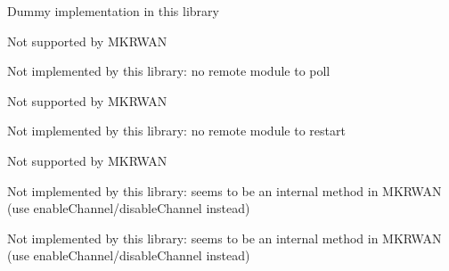 \begin{DoxyRefList}
%
 Dummy implementation in this library  
\item[Member \mbox{\hyperlink{classSTM32LoRaWAN_a14df7748a2df407809fa2862da7194be}{STM32\+Lo\+Ra\+WAN\+::modify\+Channel\+Enabled}} (unsigned pos, bool value)]\label{extensions__extensions000014}%
%
 Not supported by MKRWAN  
\item[Member \mbox{\hyperlink{classSTM32LoRaWAN_a79634164ef1e9c2d8c4d4589cbeaf665}{STM32\+Lo\+Ra\+WAN\+::poll}} ()]\label{extensions__extensions000035}%
%
 Not implemented by this library\+: no remote module to poll  
\item[Member \mbox{\hyperlink{classSTM32LoRaWAN_ac720f4ea2f3efe054908a8f8bdcfc7a5}{STM32\+Lo\+Ra\+WAN\+::powerdB}} (int8\+\_\+t db)]\label{extensions__extensions000012}%
%
 Not supported by MKRWAN  
\item[Member \mbox{\hyperlink{classSTM32LoRaWAN_a8a715c4ec0ba3a9601a229a8c43d05be}{STM32\+Lo\+Ra\+WAN\+::restart}} ()]\label{extensions__extensions000034}%
%
 Not implemented by this library\+: no remote module to restart  
\item[Member \mbox{\hyperlink{classSTM32LoRaWAN_acd434a7ebbe91a548c010355f7553460}{STM32\+Lo\+Ra\+WAN\+::send}} (const uint8\+\_\+t $\ast$payload, size\+\_\+t size, bool confirmed)]\label{extensions__extensions000019}%
%
 Not supported by MKRWAN  
\item[Member \mbox{\hyperlink{classSTM32LoRaWAN_af21b1d27c22c2e94da4ca2d368620c13}{STM32\+Lo\+Ra\+WAN\+::send\+Mask}} (String new\+Mask)]\label{extensions__extensions000045}%
%
 Not implemented by this library\+: seems to be an internal method in MKRWAN (use enable\+Channel/disable\+Channel instead)  
\item[Member \mbox{\hyperlink{classSTM32LoRaWAN_a79915834d3c8812cfd80a08d62382686}{STM32\+Lo\+Ra\+WAN\+::send\+Mask}} ()]\label{extensions__extensions000046}%
%
 Not implemented by this library\+: seems to be an internal method in MKRWAN (use enable\+Channel/disable\+Channel instead)  
\item[Member \mbox{\hyperlink{classSTM32LoRaWAN_a9a54edbb78e6b782204b2d37bed84c96}{STM32\+Lo\+Ra\+WAN\+::set\+Baud}} (unsigned long baud)]\label{extensions__extensions000030}%
%

\end{DoxyRefList}
